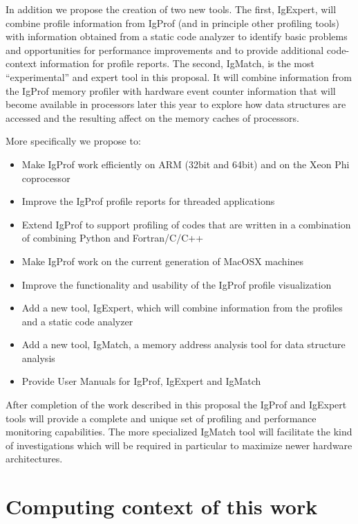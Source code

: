 \documentclass[notitlepage,letter,12pt]{article}
\begin{document}
In addition we propose the creation of two new tools. The first,
IgExpert, will combine profile information from IgProf (and in principle other
profiling tools) with information obtained from a static code analyzer
to identify basic problems and opportunities for performance improvements
and to provide additional code-context information for profile reports.
The second, IgMatch, is the most ``experimental'' and expert tool in
this proposal.  It will combine information from the IgProf memory 
profiler with hardware event counter information that will become available
in processors later this year to explore how data structures are accessed
and the resulting affect on the memory caches of processors.

More specifically we propose to:

\begin{itemize}
\item Make IgProf work efficiently on ARM (32bit and 64bit) and on the Xeon Phi coprocessor
\item Improve the IgProf profile reports for threaded applications
\item Extend IgProf to support profiling of codes that are written in a combination of combining Python and Fortran/C/C++
\item Make IgProf work on the current generation of MacOSX machines
\item Improve the functionality and usability of the IgProf profile visualization 
\item Add a new tool, IgExpert, which will combine information from the profiles and a static code analyzer 
\item Add a new tool, IgMatch, a memory address analysis tool for data structure analysis
\item Provide User Manuals for IgProf, IgExpert and IgMatch
\end{itemize}

After completion of the work described in this proposal the IgProf and
IgExpert tools will provide a complete and unique set of profiling
and performance monitoring capabilities. The more specialized IgMatch tool 
will facilitate the kind of investigations which will be required in
particular to maximize newer hardware architectures. 

\section{Computing context of this work}
\end{document}
